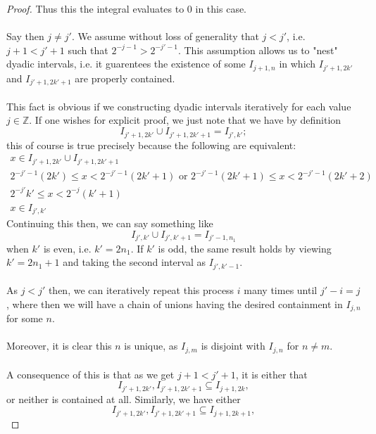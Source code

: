 \documentclass[12pt]{article}
\newenvironment{ex}[2][Exercise]{\begin{trivlist}
\item[\hskip \labelsep {\bfseries #1}\hskip \labelsep {\bfseries #2.}]}{\end{trivlist}}
\begin{document}
\begin{ex}{14}
\begin{enumerate}[label=(\alph*)]
\begin{proof}
            Thus this the integral evaluates to $0$ in this case. \\ \\
            Say then $j \neq j'$. We assume without loss of generality that $j < j'$, i.e. $j + 1 < j' + 1$ such that $2^{-j - 1} > 2^{- j' - 1}$. This assumption allows us to "nest" dyadic intervals, i.e. it guarentees the existence of some $I_{j + 1,n}$ in which $I_{j' +1, 2k'}$ and $I_{j' + 1, 2k' + 1}$ are properly contained. \\ \\This fact is obvious if we constructing dyadic intervals iteratively for each value $j \in \mathbb{Z}$. If one wishes for explicit proof, we just note that we have by definition
            $$I_{j' + 1, 2k'} \cup I_{j' + 1, 2k' + 1} = I_{j', k'};$$
            this of course is true precisely because the following are equivalent:
            \begin{align*}
                x \in I_{j' + 1, 2k'} \cup I_{j' + 1, 2k' + 1} \\
                2^{-j' - 1}(2k') \leq x < 2^{-j' - 1}(2k' + 1) \text{ or } 2^{-j' - 1}(2k' + 1) \leq x < 2^{-j' - 1}(2k' + 2) \\
                2^{-j'}k' \leq x < 2^{-j}(k' + 1) \\
                x \in I_{j', k'}
            \end{align*}
            Continuing this then, we can say something like
            $$I_{j', k'} \cup I_{j', k' + 1} = I_{j' - 1, n_1}$$
            when $k'$ is even, i.e. $k' = 2n_1$. If $k'$ is odd, the same result holds by viewing $k' = 2n_1 + 1$ and taking the second interval as $I_{j', k' - 1}$.\\ \\
            As $j < j'$ then, we can iteratively repeat this process $i$ many times until $j' - i = j$, where then we will have a chain of unions having the desired containment in $I_{j,n}$ for some $n$. \\ \\
            Moreover, it is clear this $n$ is unique, as $I_{j, m}$ is disjoint with $I_{j,n}$ for $n \neq m$. \\ \\
            A consequence of this is that as we get $j + 1 < j' + 1$, it is either that 
            $$I_{j' + 1, 2k'}, I_{j' + 1, 2k' + 1} \subseteq I_{j + 1, 2k},$$
            or neither is contained at all. Similarly, we have either 
            $$I_{j' + 1, 2k'}, I_{j' + 1, 2k' + 1} \subseteq I_{j + 1, 2k + 1},$$

\end{proof}
\end{enumerate}
\end{ex}
\end{document}
